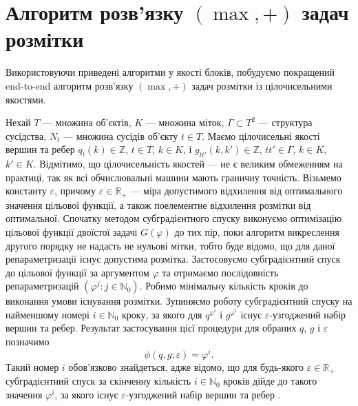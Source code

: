\section{Алгоритм розв'язку $(\max,+)$ задач розмітки}

Використовуючи приведені алгоритми у якості блоків, побудуємо покращений 
end-to-end алгоритм розв'язку $(\max,+)$ задач розмітки із цілочисельними якостями.

Нехай $T$ --- множина об'єктів, $K$ --- множина міток, $\Gamma \subset T^2$ --- структура сусідства, 
$N_t$ --- множина сусідів об'єкту $t\in T$. Маємо цілочисельні якості вершин та ребер
$q_t(k)\in \mathbb{Z}$, $t\in T$, $k\in K$, і $g_{tt'}(k,k')\in \mathbb{Z}$, $tt'\in\Gamma$, $k\in K$, $k'\in K$.
Відмітимо, що цілочисельність якостей --- не є великим обмеженням на практиці, так як всі обчислювальні машини
мають граничну точність. Візьмемо константу $\varepsilon$, причому $\varepsilon\in\mathbb{R_+}$ --- міра допустимого 
відхилення від оптимального значення цільової функції, а також поелементне відхилення розмітки від оптимальної.
Спочатку методом субградієнтного спуску виконуємо оптимізацію цільової функції двоїстої задачі $G(\varphi)$ до тих пір, поки алгоритм
викреслення другого порядку не надасть не нульові мітки, тобто буде відомо, що 
для даної репараметризації існує допустима розмітка. Застосовуємо субградієнтний 
спуск до цільової функції за аргументом $\varphi$ та отримаємо послідовність
репараметризацій $(\varphi^j:j\in\mathbb{N}_0)$. Робимо мінімальну кількість кроків до виконання умови існування розмітки.
Зупиняємо роботу субградієнтний спуску на найменшому номері $i\in\mathbb{N}_0$ кроку, 
за якого для $q^{\varphi^i}$ і $g^{\varphi^i}$ існує $\varepsilon$-узгоджений набір вершин та ребер.
Результат застосування цієї процедури для обраних $q$, $g$ і $\varepsilon$ позначимо
\begin{equation*}
    \phi(q,g;\varepsilon)=\varphi^i.
\end{equation*}
Такий номер $i$ обов'язково знайдеться, адже відомо, що для будь-якого 
$\varepsilon\in\mathbb{R_+}$ субградієнтний спуск за скінченну кількість $i\in\mathbb{N}_0$ кроків
дійде до такого значення $\varphi^i$, за якого існує $\varepsilon$-узгоджений набір вершин та ребер \cite{lopatka_stop_cond}.

